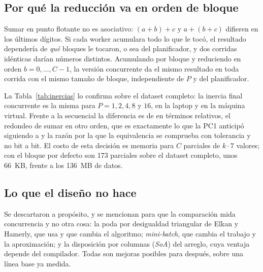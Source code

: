 \subsection{Por qué la reducción va en orden de bloque}\label{sec:reproducibilidad}

Sumar en punto flotante no es asociativo: $(a + b) + c$ y $a + (b + c)$ difieren en los últimos
dígitos. Si cada worker acumulara todo lo que le tocó, el resultado dependería de \emph{qué} bloques
le tocaron, o sea del planificador, y dos corridas idénticas darían números distintos. Acumulando por
bloque y reduciendo en orden $b = 0, \dots, C-1$, la versión concurrente da el mismo resultado en
toda corrida con el mismo tamaño de bloque, independiente de $P$ y del planificador.



La Tabla~\ref{tab:inercias} lo confirma sobre el dataset completo: la inercia final concurrente es
la misma para $P = 1, 2, 4, 8$ y $16$, en la laptop y en la máquina virtual. Frente a la secuencial la
diferencia es de  en términos relativos, el redondeo de sumar en otro orden, que
es exactamente lo que la PC1 anticipó siguiendo a \textcite{he2022} y la razón por la que la
equivalencia se comprueba con tolerancia y no bit a bit. El costo de esta decisión es memoria para
$C$ parciales de $k \cdot 7$ valores; con el bloque por defecto son 173 parciales sobre el dataset
completo, unos 66~KB, frente a los 136~MB de datos.

\subsection{Lo que el diseño no hace}

Se descartaron a propósito, y se mencionan para que la comparación mida concurrencia y no otra
cosa: la poda por desigualdad triangular de Elkan y Hamerly, que \textcite{li2023} usa y que
cambia el algoritmo; \emph{mini-batch}, que cambia el trabajo y la aproximación; y la disposición
por columnas (\emph{SoA}) del arreglo, cuya ventaja depende del compilador. Todas son mejoras
posibles para después, sobre una línea base ya medida.
